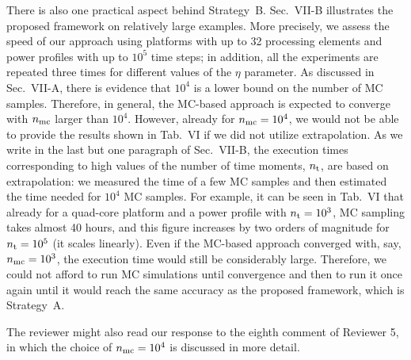 \begin{authors}
There is also one practical aspect behind Strategy~B.
Sec.~VII-B illustrates the proposed framework on relatively large examples.
More precisely, we assess the speed of our approach using platforms with up to 32 processing elements and power profiles with up to $10^5$ time steps; in addition, all the experiments are repeated three times for different values of the $\eta$ parameter.
As discussed in Sec.~VII-A, there is evidence that $10^4$ is a lower bound on the number of MC samples.
Therefore, in general, the MC-based approach is expected to converge with ${n_\text{mc}}$ larger than $10^4$.
However, already for ${n_\text{mc}} = 10^4$, we would not be able to provide the results shown in Tab.~VI if we did not utilize extrapolation.
As we write in the last but one paragraph of Sec.~VII-B, the execution times corresponding to high values of the number of time moments, ${n_\text{t}}$, are based on extrapolation: we measured the time of a few MC samples and then estimated the time needed for $10^4$ MC samples.
For example, it can be seen in Tab.~VI that already for a quad-core platform and a power profile with ${n_\text{t}} = 10^3$, MC sampling takes almost 40 hours, and this figure increases by two orders of magnitude for ${n_\text{t}} = 10^5$ (it scales linearly).
Even if the MC-based approach converged with, say, ${n_\text{mc}} = 10^3$, the execution time would still be considerably large.
Therefore, we could not afford to run MC simulations until convergence and then to run it once again until it would reach the same accuracy as the proposed framework, which is Strategy~A.

The reviewer might also read our response to the eighth comment of Reviewer 5, in which the choice of ${n_\text{mc}} = 10^4$ is discussed in more detail.

\begin{actions}
\end{actions}
\end{authors}


